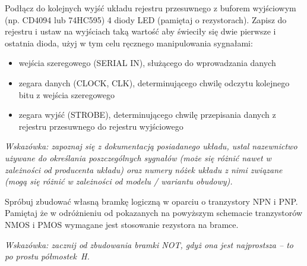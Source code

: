 \dbEntryCheckResults
Podłącz do kolejnych wyjść układu rejestru przesuwnego z buforem wyjściowym (np. CD4094 lub 74HC595) 4 diody LED (pamiętaj o rezystorach).
Zapisz do rejestru i ustaw na wyjściach taką wartość aby świeciły się dwie pierwsze i ostatnia dioda, użyj w tym celu ręcznego manipulowania sygnałami:
\begin{itemize}
\item wejścia szeregowego (SERIAL IN), służącego do wprowadzania danych
\item zegara danych (CLOCK, CLK), determinującego chwilę odczytu kolejnego bitu z wejścia szeregowego
\item zegara wyjść (STROBE), determinującego chwilę przepisania danych z rejestru przesuwnego do rejestru wyjściowego
\end{itemize}

\textit{Wskazówka: zapoznaj się z dokumentacją posiadanego układu, ustal nazewnictwo używane do określania poszczególnych sygnałów (może się różnić nawet w zależności od producenta układu) oraz numery nóżek układu z nimi związane (mogą się różnić w zależności od modelu / wariantu obudowy).}
\fi

\dbEntryCheckResults
Spróbuj zbudować własną bramkę logiczną w oparciu o tranzystory NPN i PNP. Pamiętaj że w odróżnieniu od pokazanych na powyższym schemacie tranzystorów NMOS i PMOS wymagane jest stosowanie rezystora na bramce.

\textit{Wskazówka: zacznij od zbudowania bramki NOT, gdyż ona jest najprostsza – to po prostu półmostek H.}
\fi
